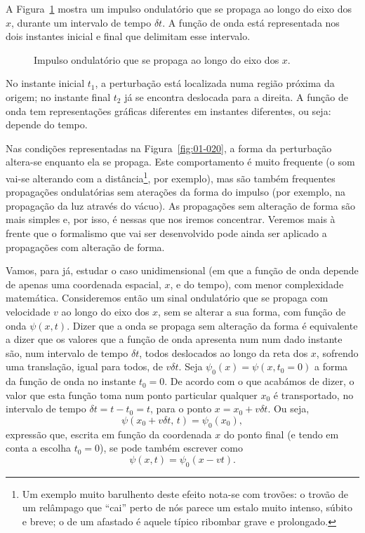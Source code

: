 A Figura~\ref{fig:20-030} mostra um impulso ondulatório que se propaga ao longo
do eixo dos $x$, durante um intervalo de tempo $\delta t$. A função de onda está
representada nos dois instantes inicial e final que delimitam esse intervalo.
\begin{figure}[htb]
    {\centering
        \par
    }
    \caption{Impulso ondulatório que se propaga ao longo do eixo dos
    $x$.\label{fig:20-030}}
\end{figure}
No instante inicial $t_1$, a perturbação está localizada numa região próxima da
origem; no instante final $t_2$ já se encontra deslocada para a
direita. A função de onda tem representações gráficas diferentes em instantes
diferentes, ou seja: depende do tempo.

Nas condições representadas na Figura~\ref{fig:01-020}, a forma da perturbação
altera-se enquanto ela se propaga. Este comportamento é muito frequente (o som
vai-se alterando com a distância\footnote{Um exemplo muito barulhento deste
  efeito nota-se com trovões: o trovão de um relâmpago que ``cai'' perto de nós
  parece um estalo muito intenso, súbito e breve; o de um afastado é aquele
típico ribombar grave e prolongado.}, por exemplo), mas são também frequentes
propagações ondulatórias sem aterações da forma do impulso (por exemplo, na
propagação da luz através do vácuo). As propagações sem alteração de forma são
mais simples e, por isso, é nessas que nos iremos concentrar. Veremos mais à
frente que o formalismo que vai ser desenvolvido pode ainda ser aplicado a
propagações com alteração de forma. 

Vamos, para já, estudar o caso unidimensional (em que a função de onda depende
de apenas uma coordenada espacial, $x$, e do tempo), com menor complexidade
matemática. Consideremos então um sinal ondulatório que se propaga com
velocidade $v$ ao longo do eixo dos $x$, sem se alterar a sua forma, com função
de onda $\psi(x,t)$. Dizer que a onda se propaga sem alteração da forma é
equivalente a dizer que os valores que a função de onda apresenta num num dado
instante são, num intervalo de tempo $\delta t$, todos deslocados ao longo da
reta dos $x$, sofrendo uma translação, igual para todos, de $v\delta t$. Seja
$\psi_0(x)=\psi(x,t_0=0)$ a forma da função de onda no instante $t_0=0$. De
acordo com o que acabámos de dizer, o valor que esta função toma num ponto
particular qualquer $x_0$ é transportado, no intervalo de tempo $\delta
t=t-t_0=t$, para o ponto $x=x_0+v\delta t$. Ou seja,
\begin{equation*}
  \psi(x_0+v\delta t,\,t)=\psi_0(x_0),
\end{equation*}
expressão que, escrita em função da coordenada $x$ do ponto final (e tendo em
conta a escolha $t_0=0$), se pode também escrever como
\begin{equation*}
  \psi(x,t)=\psi_0(x-vt).
\end{equation*}

